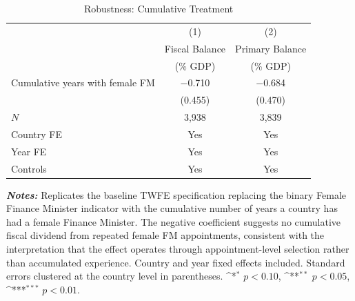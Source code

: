 \begin{table}[htbp]\centering
\def\sym#1{\ifmmode^{#1}\else\(^{#1}\)\fi}
\caption{Robustness: Cumulative Treatment}
\label{tab:robust_cumulative}
\begin{tabular}{l*{2}{c}}
\toprule
            &\multicolumn{1}{c}{(1)}&\multicolumn{1}{c}{(2)}\\
            &\multicolumn{1}{c}{Fiscal Balance}&\multicolumn{1}{c}{Primary Balance}\\
            &\multicolumn{1}{c}{(\% GDP)}&\multicolumn{1}{c}{(\% GDP)}\\
\midrule
Cumulative years with female FM
            & $-$0.710  & $-$0.684  \\
            & (0.455)   & (0.470)   \\
\midrule
$N$         & 3,938     & 3,839     \\
Country FE  & Yes       & Yes       \\
Year FE     & Yes       & Yes       \\
Controls    & Yes       & Yes       \\
\bottomrule
\end{tabular}
\begin{minipage}{\textwidth}
\vspace{4pt}
\footnotesize \textit{\textbf{Notes:}} Replicates the baseline TWFE
specification replacing the binary Female Finance Minister indicator
with the cumulative number of years a country has had a female Finance
Minister. The negative coefficient suggests no cumulative fiscal
dividend from repeated female FM appointments, consistent with the
interpretation that the effect operates through appointment-level
selection rather than accumulated experience. Country and year fixed
effects included. Standard errors clustered at the country level in
parentheses. \sym{*} $p<0.10$, \sym{**} $p<0.05$, \sym{***}
$p<0.01$.
\end{minipage}
\end{table}